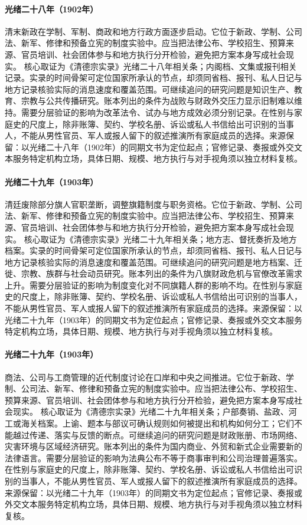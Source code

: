 \hypertarget{public:EQ-1902-NEW-POLICIES-EDUCATION}{}\paragraph{光绪二十八年（1902年）}清末新政在学制、军制、商政和地方行政方面逐步启动。它位于新政、学制、公司法、新军、修律和预备立宪的制度实验中。应当把法律公布、学校招生、预算来源、官员培训、社会团体参与和地方执行分开检验，避免把方案本身写成社会现实。 核心取证为《清德宗实录》光绪二十八年相关条；内阁档、文集或报刊相关记录。实录的时间骨架可定位国家所承认的节点，却须同省档、报刊、私人日记与地方记录核验实际的消息速度和覆盖范围。可继续追问的研究问题是知识生产、教育、宗教与公共传播研究。账本列出的条件为战败与财政外交压力显示旧制难以维持。需要分层验证的影响为改革法令、试办与地方成效必须分别记录。在性别与家庭史的尺度上，除非账簿、契约、学校名册、诉讼或私人书信给出可识别的当事人，不能从男性官员、军人或报人留下的叙述推演所有家庭成员的选择。来源保留：以光绪二十八年（1902年）的同期文书为定位起点；官修记录、奏报或外交文本服务特定机构立场，具体日期、规模、地方执行与对手视角须以独立材料复核。
\hypertarget{public:EQ-1903-BANNER-POSTS-REFORM}{}\paragraph{光绪二十九年（1903年）}清廷废除部分旗人官职垄断，调整旗籍制度与职务资格。它位于新政、学制、公司法、新军、修律和预备立宪的制度实验中。应当把法律公布、学校招生、预算来源、官员培训、社会团体参与和地方执行分开检验，避免把方案本身写成社会现实。 核心取证为《清德宗实录》光绪二十九年相关条；地方志、督抚奏折及地方档案。实录的时间骨架可定位国家所承认的节点，却须同省档、报刊、私人日记与地方记录核验实际的消息速度和覆盖范围。可继续追问的研究问题是地方档案、迁徙、宗教、族群与社会动员研究。账本列出的条件为八旗财政危机与官僚改革需求上升。需要分层验证的影响为制度变化对不同旗籍人群的影响不均。在性别与家庭史的尺度上，除非账簿、契约、学校名册、诉讼或私人书信给出可识别的当事人，不能从男性官员、军人或报人留下的叙述推演所有家庭成员的选择。来源保留：以光绪二十九年（1903年）的同期文书为定位起点；官修记录、奏报或外交文本服务特定机构立场，具体日期、规模、地方执行与对手视角须以独立材料复核。
\hypertarget{public:EQ-1903-SHANGHAI-COMMERCIAL-LAW}{}\paragraph{光绪二十九年（1903年）}商法、公司与工商管理的近代制度讨论在口岸和中央之间推进。它位于新政、学制、公司法、新军、修律和预备立宪的制度实验中。应当把法律公布、学校招生、预算来源、官员培训、社会团体参与和地方执行分开检验，避免把方案本身写成社会现实。 核心取证为《清德宗实录》光绪二十九年相关条；户部奏销、盐政、河工或海关档案。上谕、题本与部议可确认规则如何被提出和机构如何分工；它们不能越过传递、落实与反馈的断点。可继续追问的研究问题是财政账册、市场网络、灾害环境与区域经济研究。账本列出的条件为国内商业、外贸和新式企业需要新的法律语言。需要分层验证的影响为法典公布不等于商事审判和公司治理普遍落实。在性别与家庭史的尺度上，除非账簿、契约、学校名册、诉讼或私人书信给出可识别的当事人，不能从男性官员、军人或报人留下的叙述推演所有家庭成员的选择。来源保留：以光绪二十九年（1903年）的同期文书为定位起点；官修记录、奏报或外交文本服务特定机构立场，具体日期、规模、地方执行与对手视角须以独立材料复核。

